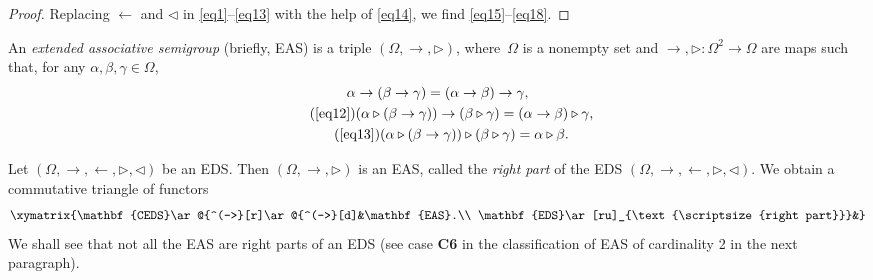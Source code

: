\documentclass[pdftex]{sigma}
\numberwithin{equation}{section}
\begin{document}
\begin{proof}
Replacing $\leftarrow$ and $\triangleleft$ in \eqref{eq1}--\eqref{eq13} with the help of \eqref{eq14}, we find \eqref{eq15}--\eqref{eq18}.
\end{proof}

\begin{Definition}
An \emph{extended associative semigroup} (briefly, EAS) is a triple $(\Omega,\rightarrow,\triangleright)$, where~$\Omega$ is a nonempty set and $\rightarrow,\triangleright\colon\Omega^2\longrightarrow \Omega$ are maps such that, for any $\alpha,\beta,\gamma \in \Omega$,
\begin{gather}
\label{eq19} \alpha \rightarrow (\beta \rightarrow \gamma) =(\alpha \rightarrow \beta) \rightarrow \gamma,\\
\tag{\ref{eq12}}(\alpha \triangleright (\beta \rightarrow \gamma))\rightarrow (\beta \triangleright \gamma) =(\alpha \rightarrow \beta)\triangleright \gamma,\\
\tag{\ref{eq13}}(\alpha \triangleright (\beta \rightarrow \gamma))\triangleright (\beta \triangleright \gamma) =\alpha \triangleright \beta.
\end{gather}\end{Definition}

\begin{Remark}
Let $(\Omega,\rightarrow,\leftarrow,\triangleright,\triangleleft)$ be an EDS. Then $(\Omega,\rightarrow,\triangleright)$ is an EAS, called the \emph{right part} of the EDS $(\Omega,\rightarrow,\leftarrow,\triangleright,\triangleleft)$.
We obtain a commutative triangle of functors
\[\xymatrix{\mathbf{CEDS}\ar@{^(->}[r]\ar@{^(->}[d]&\mathbf{EAS}.\\
\mathbf{EDS}\ar[ru]_{\text{\scriptsize{right part}}}&}\]
We shall see that not all the EAS are right parts of an EDS (see case \textbf{C6} in the classification of EAS of cardinality 2 in the next paragraph).
\end{Remark}
\end{document}
